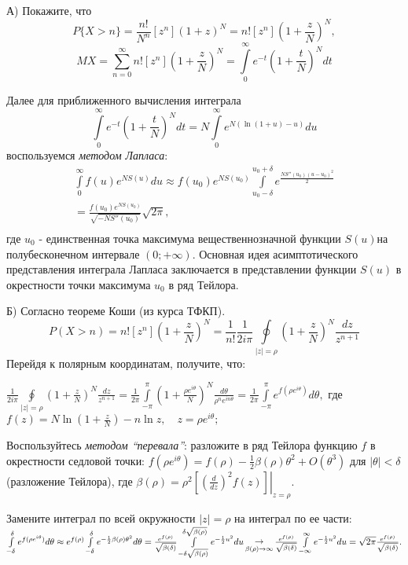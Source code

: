 \begin{ordre}

А) Покажите, что  
\[
P\{X>n\}=\frac{n!}{N^n}\left[ {z^n} \right]\left( {1+z} 
\right)^N=n!\left[ {z^n} \right]\left( {1+\frac{z}{N}} \right)^N, 
\]
\[
MX=\sum\limits_{n=0}^\infty {n!\left[ {z^n} \right]} \left( {1+\frac{z}{N}} 
\right)^N=\int\limits_0^\infty {e^{-t}\left( {1+\frac{t}{N}} \right)^Ndt} 
\] 

Далее для приближенного вычисления интеграла  
\[
\int\limits_0^\infty 
{e^{-t}\left( {1+\frac{t}{N}} \right)^Ndt} =N\int\limits_0^\infty 
{e^{N\left( {\ln (1+u)-u} \right)}du} 
\]
 воспользуемся \textit{методом Лапласа}:
\[
\begin{array}{l}
 \int\limits_0^\infty {f(u)e^{NS(u)}du} \approx f(u_0 )e^{NS(u_0 
)}\int\limits_{u_0 -\delta }^{u_0 +\delta } {e^{\frac{NS''(u_0 )(u-u_0 
)^2}{2}}} \\
 =\frac{f(u_0 )e^{NS(u_0 )}}{\sqrt {-NS''(u_0 )} }\sqrt {2\pi } , \\ 
 \end{array}
\]
где $u_0 $ - единственная точка максимума вещественнозначной функции 
$S(u)$на полубесконечном интервале $(0;+\infty )$. Основная идея 
асимптотического представления интеграла Лапласа заключается в представлении 
функции $S(u)$ в окрестности точки максимума $u_0 $ в ряд Тейлора.

Б) Согласно теореме Коши (из курса ТФКП). 
\[
P(X>n)=n!\left[ {z^n} \right]\left( {1+\frac{z}{N}} 
\right)^N=\frac{1}{n!}\frac{1}{2i\pi }\oint\limits_{\vert z\vert =\rho } 
{\left( {1+\frac{z}{N}} \right)^N\frac{dz}{z^{n+1}}} 
\]
Перейдя к полярным координатам, получите, что:

$\frac{1}{2i\pi }\oint\limits_{\vert z\vert =\rho } {\left( {1+\frac{z}{N}} 
\right)^N\frac{dz}{z^{n+1}}} =\frac{1}{2\pi }\int\limits_{-\pi }^\pi {\left( 
{1+\frac{\rho e^{i\theta }}{N}} \right)^N\frac{d\theta }{\rho ^ne^{in\theta 
}}} =\frac{1}{2\pi }\int\limits_{-\pi }^\pi {e^{f(\rho e^{i\theta })}d\theta 
} ,$ где $f(z)=N\ln \left( {1+\frac{z}{N}} \right)-n\ln z,\quad z=\rho 
e^{i\theta };$

Воспользуйтесь \textit{методом ``перевала''}: разложите в ряд Тейлора функцию $f$ в окрестности седловой 
точки: $f(\rho e^{i\theta })=f(\rho )-\frac{1}{2}\beta (\rho )\theta 
^2+O(\theta ^3)$ для $\left| \theta \right|<\delta $ (разложение Тейлора), 
где $\beta (\rho )=\rho ^2\left. {\left[ {\left( {\frac{d}{dz}} 
\right)^2f(z)} \right]} \right|_{z=\rho } $.

Замените интеграл по всей окружности $\vert z\vert =\rho $ на интеграл по ее 
части: $\int\limits_{-\delta }^\delta {e^{f(\rho e^{i\theta })}d\theta } 
\approx e^{f(\rho )}\int\limits_{-\delta }^\delta {e^{-\frac{1}{2}\beta 
(\rho )\theta ^2}d\theta } = \\ \frac{e^{f(\rho )}}{\sqrt {\beta (\delta )} 
}\int\limits_{-\delta \sqrt {\beta (\rho )} }^{\delta \sqrt {\beta (\rho )} 
} {e^{-\frac{1}{2}u^2}du} \mathop \to \limits_{\beta (\rho )\to \infty } 
\frac{e^{f(\rho )}}{\sqrt {\beta (\delta )} }\int\limits_{-\infty }^\infty 
{e^{-\frac{1}{2}u^2}du} = 
 \sqrt {2\pi } \frac{e^{f(\rho )}}{\sqrt {\beta 
(\delta )} }.$


\end{ordre}
